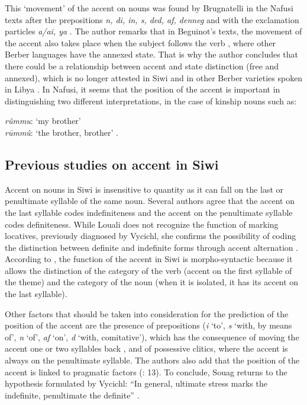 \documentclass[output=paper]{langsci/langscibook}
\begin{document}
This `movement' of the accent on nouns was found by Brugnatelli in the Nafusi texts after the prepositions {\emph{n, di, in, s, ded, af, denneg}} and with the exclamation particles {\emph{a/ai, ya}} \citep[][64-65]{brugnatelli:86}. The author remarks that in Beguinot's texts, the movement of the accent also takes place when the subject follows the verb \citep[][66]{brugnatelli:86}, where other Berber languages have the annexed state. That is why the author concludes that there could be a relationship between accent and state distinction (free and annexed), which is no longer attested in Siwi and in other Berber varieties spoken in Libya \citep[][68]{brugnatelli:86}. In Nafusi, it seems that the position of the accent is important in distinguishing two different interpretations, in the case of kinship nouns such as:

\begin{exe}
\exi{}
{\emph{rûmmu}}: `my brother' \\
{\emph{rūmmû}}: `the brother, brother' \citep[][28-29]{beguinot:42}.
\end{exe}


\subsection{Previous studies on accent in Siwi}\label{5sec:13}

Accent on nouns in Siwi is insensitive to quantity as it can fall on the last or penultimate syllable of the same noun. Several authors agree that the accent on the last syllable codes indefiniteness and the accent on the penultimate syllable codes definiteness. While Louali does not recognize the function of marking locatives, previously diagnosed by Vycichl, she confirms the possibility of coding the distinction between definite and indefinite forms through accent alternation \citep[][68-69]{louali:03}. According to \cite{louali:philippson:04,louali:philippson:05}, the function of the accent in Siwi is morpho-syntactic because it allows the distinction of the category of the verb (accent on the first syllable of the theme) and the category of the noun (when it is isolated, it has its accent on the last syllable).

{
Other factors that should be taken into consideration for the prediction of the position of the accent are the presence of prepositions ({\emph{i}} `to', {\emph{s}} `with, by means of', {\emph{n}} `of', {\emph{af}} `on', {\emph{d}} `with, comitative'), which has the consequence of moving the accent one or two syllables back \citep{louali:philippson:05}, and of possessive clitics, where the accent is always on the penultimate syllable. The authors also add that the position of the accent is linked to  pragmatic factors (\citeyear{louali:philippson:05}: 13). To conclude, Souag returns to the hypothesis formulated by Vycichl: ``In general, ultimate stress marks the indefinite, penultimate the definite'' \citep[][80]{souag:13}.
}
\end{document}
